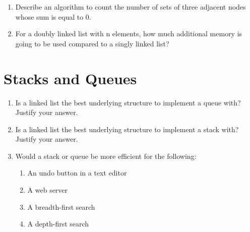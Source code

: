 \documentclass[11pt]{article}
\begin{document}
    \begin{enumerate}
    
        \item Describe an algorithm to count the number of sets of three adjacent nodes whose sum is equal to 0.
        
        \item For a doubly linked list with n elements, how much additional memory is going to be used compared to a singly linked list?
    
    \end{enumerate}
    
    \section{Stacks and Queues}
    \begin{enumerate}

        \item Is a linked list the best underlying structure to implement a queue with? Justify your answer.
        
        \item Is a linked list the best underlying structure to implement a stack with? Justify your answer.
        
        \item Would a stack or queue be more efficient for the following:
        \begin{enumerate}
            \item An undo button in a text editor
            \item A web server
            \item A breadth-first search
            \item A depth-first search
        \end{enumerate}
    \end{enumerate}
    
    \label{r:lastpage}
    
    
\end{document}
